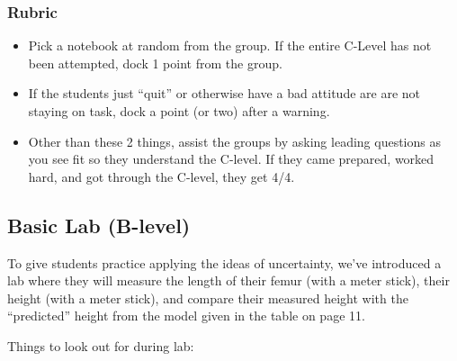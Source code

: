 \documentclass[fleqn,letterpaper]{article}
\begin{document}
\subsubsection*{Rubric}

\begin{itemize}
 \item{Pick a notebook at random from the group.  If the entire C-Level has not been attempted, dock 1 point from the group.}
 \item{If the students just ``quit'' or otherwise have a bad attitude are are not staying on task, dock a point (or two) after a warning.}
 \item{Other than these 2 things, assist the groups by asking leading questions as you see fit so they understand the C-level.  If they came prepared, worked hard, and got through the C-level, they get 4/4.}
\end{itemize}


\subsection*{Basic Lab (B-level)}

To give students practice applying the ideas of uncertainty, we've introduced a lab where they will measure the length of their femur (with a meter stick), their height (with a meter stick), and compare their measured height with the ``predicted'' height from the model given in the table on page 11.

Things to look out for during lab:
\end{document}
